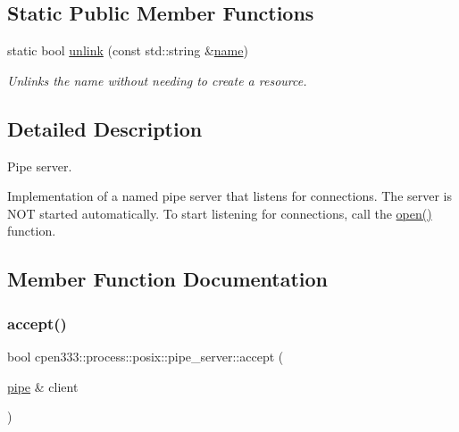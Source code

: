 \subsection*{Static Public Member Functions}
\begin{DoxyCompactItemize}
\item 
static bool \hyperlink{classcpen333_1_1process_1_1posix_1_1pipe__server_a7962624ab13060295c1f0b1f0d871e13}{unlink} (const std\+::string \&\hyperlink{classcpen333_1_1process_1_1impl_1_1named__resource__base_a53986a0a1dd26a3602b842c45613b79d}{name})
\begin{DoxyCompactList}\small\item\em Unlinks the name without needing to create a resource. \end{DoxyCompactList}\end{DoxyCompactItemize}


\subsection{Detailed Description}
Pipe server. 

Implementation of a named pipe server that listens for connections. The server is N\+OT started automatically. To start listening for connections, call the \hyperlink{classcpen333_1_1process_1_1posix_1_1pipe__server_afcb8bad74a3f5540e2dba294a2bb1e5a}{open()} function. 

\subsection{Member Function Documentation}
\mbox{\label{classcpen333_1_1process_1_1posix_1_1pipe__server_a9acf7d28f7b58a58f04360110cae1fff}} 
\subsubsection{\texorpdfstring{accept()}{accept()}}
{\footnotesize\ttfamily bool cpen333\+::process\+::posix\+::pipe\+\_\+server\+::accept (\begin{DoxyParamCaption}\item[{\hyperlink{classcpen333_1_1process_1_1posix_1_1pipe}{pipe} \&}]{client }\end{DoxyParamCaption})\hspace{0.3cm}{\ttfamily [inline]}}



